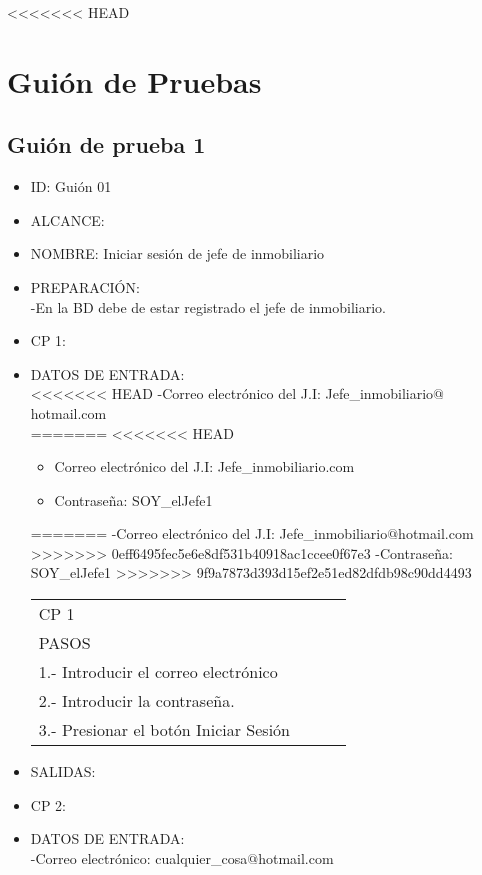 <<<<<<< HEAD
\section{Guión de Pruebas}

\subsection{Guión de prueba 1}
\begin{itemize}
\item ID: Guión 01
\item ALCANCE: 
\item NOMBRE: Iniciar sesión de jefe de inmobiliario  
\item PREPARACIÓN:\\
-En la BD debe de estar registrado el jefe de inmobiliario.
\item CP 1:
\item DATOS DE ENTRADA:\\
<<<<<<< HEAD
	-Correo electrónico del J.I: Jefe\_inmobiliario$@$hotmail.com\\
=======
<<<<<<< HEAD
	\begin{itemize}
		\item Correo electrónico del J.I: Jefe\_inmobiliario\@hotmail.com
		\item Contraseña: SOY\_elJefe1
	\end{itemize}
=======
	-Correo electrónico del J.I: Jefe\_inmobiliario$@$hotmail.com
>>>>>>> 0eff6495fec5e6e8df531b40918ac1ccee0f67e3
	-Contraseña: SOY\_elJefe1
>>>>>>> 9f9a7873d393d15ef2e51ed82dfdb98c90dd4493
\begin{center}			
	\begin{tabular}{|l|l|l|l|}
		\hline
		CP 1\\
		PASOS\\
		\hline 1.- Introducir el correo electrónico\\
		\hline 2.- Introducir la contraseña.\\
		\hline 3.- Presionar el botón Iniciar Sesión\\
		\hline
	\end{tabular}
\end{center}
\item SALIDAS: \label{CU1LoginJI}
\item CP 2:
\item DATOS DE ENTRADA:\\
	-Correo electrónico: cualquier\_cosa$@$hotmail.com\\

\end{itemize}
